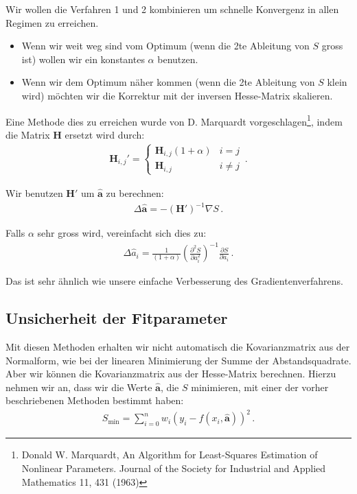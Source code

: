 Wir wollen die Verfahren 1 und 2 kombinieren um schnelle Konvergenz in allen Regimen zu erreichen.
\begin{itemize}
    \setlength\itemsep{0em}
        \item Wenn wir weit weg sind vom Optimum (wenn die 2te Ableitung von $S$ gross ist) wollen wir ein konstantes $\alpha$ benutzen.
        \item Wenn wir dem Optimum n\"aher kommen (wenn die 2te Ableitung von $S$ klein wird) m\"ochten wir die Korrektur mit der inversen Hesse-Matrix skalieren.
\end{itemize}

Eine Methode dies zu erreichen wurde von D. Marquardt vorgeschlagen\footnote{Donald W. Marquardt, An Algorithm for Least-Squares Estimation of Nonlinear Parameters. Journal of the Society for Industrial and Applied Mathematics 11, 431 (1963)}, indem die Matrix $\boldsymbol{H}$ ersetzt wird durch:
\begin{align}
\boldsymbol{H}_{i,j}' =
    \begin{cases}
        \boldsymbol{H}_{i,j} (1 + \alpha) &i = j \\
        \boldsymbol{H}_{i,j} &i \neq j 
    \end{cases}\,.       
\label{eq:vl9-16}
\end{align}

Wir benutzen $\boldsymbol{H}'$ um $\boldsymbol{\hat{a}}$ zu berechnen:
\begin{align}
\Delta \boldsymbol{\hat{a}} = - (\boldsymbol{H}')^{-1} \nabla S\,.
\label{eq:vl9-17}
\end{align}

Falls $\alpha$ sehr gross wird, vereinfacht sich dies zu:
\begin{align}
\Delta \hat{a}_i = \frac{1}{ (1 + \alpha) } \left( \frac{ \partial^2 S }{ \partial a_i^2 } \right)^{-1} \frac{ \partial S }{ \partial a_i } \,.
\label{eq:vl9-18}
\end{align}

Das ist sehr \"ahnlich wie unsere einfache Verbesserung des Gradientenverfahrens.


\subsection{Unsicherheit der Fitparameter}
\label{subsec:vl9-2}

Mit diesen Methoden erhalten wir nicht automatisch die Kovarianzmatrix aus der Normalform, wie bei der linearen Minimierung der Summe der Abstandsquadrate. Aber wir k\"onnen die Kovarianzmatrix aus der Hesse-Matrix berechnen. Hierzu nehmen wir an, dass wir die Werte $\boldsymbol{\hat{a}}$, die $S$ minimieren, mit einer der vorher beschriebenen Methoden bestimmt haben:
\begin{align}
S_\text{min} = \sum_{i=0}^n w_i (y_i - f (x_i, \boldsymbol{\hat{a}}))^2\,.
\label{eq:vl9-19}
\end{align}

